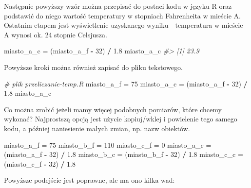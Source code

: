 \documentclass[paper=6in:9in,pagesize=pdftex,headinclude=on,footinclude=on,10pt]{scrbook}
\newenvironment{Shaded}{\begin{snugshade}}{\end{snugshade}}
\newcommand{\CommentTok}[1]{\textcolor[rgb]{0.56,0.35,0.01}{\textit{#1}}}
\newcommand{\DecValTok}[1]{\textcolor[rgb]{0.00,0.00,0.81}{#1}}
\newcommand{\FloatTok}[1]{\textcolor[rgb]{0.00,0.00,0.81}{#1}}
\newcommand{\NormalTok}[1]{#1}
\newcommand{\OperatorTok}[1]{\textcolor[rgb]{0.81,0.36,0.00}{\textbf{#1}}}
\newcommand{\StringTok}[1]{\textcolor[rgb]{0.31,0.60,0.02}{#1}}
\begin{document}
Następnie powyższy wzór można przepisać do postaci kodu w języku R oraz podstawić do niego wartość temperatury w stopniach Fahrenheita w mieście A.
Ostatnim etapem jest wyświetlenie uzyskanego wyniku - temperatura w mieście A wynosi ok. 24 stopnie Celsjusza.

\begin{Shaded}
\begin{Highlighting}[]
\NormalTok{miasto_a_c =}\StringTok{ }\NormalTok{(miasto_a_f }\OperatorTok{-}\StringTok{ }\DecValTok{32}\NormalTok{) }\OperatorTok{/}\StringTok{ }\FloatTok{1.8}
\NormalTok{miasto_a_c}
\CommentTok{#> [1] 23.9}
\end{Highlighting}
\end{Shaded}

Powyższe kroki można również zapisać do pliku tekstowego.

\begin{Shaded}
\begin{Highlighting}[]
\CommentTok{# plik przeliczanie-temp.R}
\NormalTok{miasto_a_f =}\StringTok{ }\DecValTok{75}
\NormalTok{miasto_a_c =}\StringTok{ }\NormalTok{(miasto_a_f }\OperatorTok{-}\StringTok{ }\DecValTok{32}\NormalTok{) }\OperatorTok{/}\StringTok{ }\FloatTok{1.8}
\NormalTok{miasto_a_c}
\end{Highlighting}
\end{Shaded}

Co można zrobić jeżeli mamy więcej podobnych pomiarów, które chcemy wykonać?
Najprostszą opcją jest użycie kopiuj/wklej i powielenie tego samego kodu, a później naniesienie małych zmian, np. nazw obiektów.

\begin{Shaded}
\begin{Highlighting}[]
\NormalTok{miasto_a_f =}\StringTok{ }\DecValTok{75}
\NormalTok{miasto_b_f =}\StringTok{ }\DecValTok{110}
\NormalTok{miasto_c_f =}\StringTok{ }\DecValTok{0}
\NormalTok{miasto_a_c =}\StringTok{ }\NormalTok{(miasto_a_f }\OperatorTok{-}\StringTok{ }\DecValTok{32}\NormalTok{) }\OperatorTok{/}\StringTok{ }\FloatTok{1.8}
\NormalTok{miasto_b_c =}\StringTok{ }\NormalTok{(miasto_b_f }\OperatorTok{-}\StringTok{ }\DecValTok{32}\NormalTok{) }\OperatorTok{/}\StringTok{ }\FloatTok{1.8}
\NormalTok{miasto_c_c =}\StringTok{ }\NormalTok{(miasto_c_f }\OperatorTok{-}\StringTok{ }\DecValTok{32}\NormalTok{) }\OperatorTok{/}\StringTok{ }\FloatTok{1.8}
\end{Highlighting}
\end{Shaded}

Powyższe podejście jest poprawne, ale ma ono kilka wad:
\end{document}
